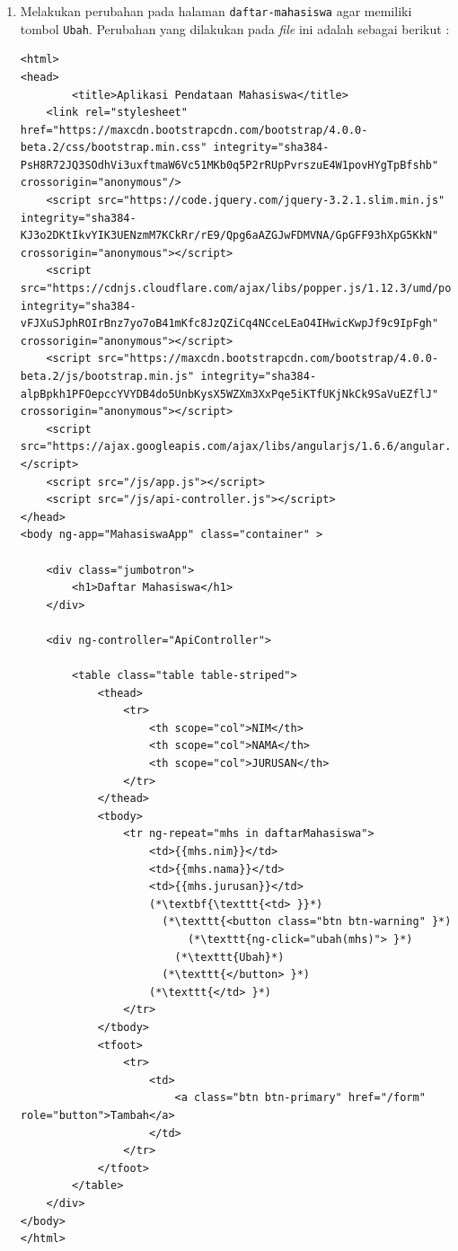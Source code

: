 \begin{enumerate}
	\item Melakukan perubahan pada halaman \texttt{daftar-mahasiswa} agar memiliki tombol \texttt{Ubah}. Perubahan yang dilakukan pada \textit{file} ini adalah sebagai berikut :
	
	\begin{lstlisting}
<html>
<head>
        <title>Aplikasi Pendataan Mahasiswa</title>
    <link rel="stylesheet" href="https://maxcdn.bootstrapcdn.com/bootstrap/4.0.0-beta.2/css/bootstrap.min.css" integrity="sha384-PsH8R72JQ3SOdhVi3uxftmaW6Vc51MKb0q5P2rRUpPvrszuE4W1povHYgTpBfshb" crossorigin="anonymous"/>
    <script src="https://code.jquery.com/jquery-3.2.1.slim.min.js" integrity="sha384-KJ3o2DKtIkvYIK3UENzmM7KCkRr/rE9/Qpg6aAZGJwFDMVNA/GpGFF93hXpG5KkN" crossorigin="anonymous"></script>
    <script src="https://cdnjs.cloudflare.com/ajax/libs/popper.js/1.12.3/umd/popper.min.js" integrity="sha384-vFJXuSJphROIrBnz7yo7oB41mKfc8JzQZiCq4NCceLEaO4IHwicKwpJf9c9IpFgh" crossorigin="anonymous"></script>
    <script src="https://maxcdn.bootstrapcdn.com/bootstrap/4.0.0-beta.2/js/bootstrap.min.js" integrity="sha384-alpBpkh1PFOepccYVYDB4do5UnbKysX5WZXm3XxPqe5iKTfUKjNkCk9SaVuEZflJ" crossorigin="anonymous"></script>
    <script src="https://ajax.googleapis.com/ajax/libs/angularjs/1.6.6/angular.min.js"></script>
    <script src="/js/app.js"></script>
    <script src="/js/api-controller.js"></script>
</head>
<body ng-app="MahasiswaApp" class="container" >

    <div class="jumbotron">
        <h1>Daftar Mahasiswa</h1>
    </div>

    <div ng-controller="ApiController">

        <table class="table table-striped">
            <thead>
                <tr>
                    <th scope="col">NIM</th>
                    <th scope="col">NAMA</th>
                    <th scope="col">JURUSAN</th>
                </tr>
            </thead>
            <tbody>
                <tr ng-repeat="mhs in daftarMahasiswa">
                    <td>{{mhs.nim}}</td>
                    <td>{{mhs.nama}}</td>
                    <td>{{mhs.jurusan}}</td>
                    (*\textbf{\texttt{<td> }}*)
                      (*\texttt{<button class="btn btn-warning" }*) 
                          (*\texttt{ng-click="ubah(mhs)"> }*)
                        (*\texttt{Ubah}*)
                      (*\texttt{</button> }*)
                    (*\texttt{</td> }*)
                </tr>
            </tbody>            
            <tfoot>
                <tr>
                    <td>
                        <a class="btn btn-primary" href="/form" role="button">Tambah</a>
                    </td>
                </tr>
            </tfoot>
        </table>
    </div>
</body>
</html>
	\end{lstlisting}
	

\end{enumerate}
